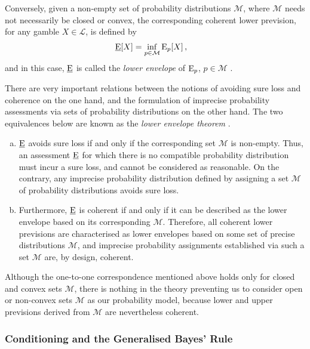 Conversely, given a non-empty set of probability distributions $\mathcal{M}$,
where $\mathcal{M}$ needs not necessarily be closed or convex,
the corresponding coherent lower prevision, for any gamble $X \in \mathcal{L}$,
is defined by
\begin{align*}
\underline{\operatorname{E}}[X] &= \inf_{p \in \mathcal{M}} \operatorname{E}_p[X]\,,
\end{align*}
and in this case, $\underline{\operatorname{E}}$ is called the \emph{lower envelope} of $\operatorname{E}_p$, $p \in \mathcal{M}$
\parencite[p.~132]{1991:walley}.

There are very important relations between the notions of avoiding sure loss and coherence on the one hand,
and the formulation of imprecise probability assessments via sets of probability distributions on the other hand.
The two equivalences below are known as the \emph{lower envelope theorem} \parencite[\S 3.3.3]{1991:walley}.
\begin{enumerate}[(a)]
\item $\underline{\operatorname{E}}$ avoids sure loss if and only if the corresponding set $\mathcal{M}$ is non-empty.
Thus, an assessment $\underline{\operatorname{E}}$ for which there is no compatible probability distribution
must incur a sure loss, and cannot be considered as reasonable.
On the contrary, any imprecise probability distribution defined by assigning
a set $\mathcal{M}$ of probability distributions avoids sure loss.
\item Furthermore, $\underline{\operatorname{E}}$ is coherent if and only if it can be
described as the lower envelope based on its corresponding $\mathcal{M}$.
Therefore, all coherent lower previsions are characterised as
lower envelopes based on some set of precise distributions $\mathcal{M}$,
and imprecise probability assignments established via such a set $\mathcal{M}$
are, by design, coherent.
\end{enumerate}

Although the one-to-one correspondence mentioned above holds only for closed and convex sets $\mathcal{M}$,
there is nothing in the theory preventing us to consider
open or non-convex sets $\mathcal{M}$ as our probability model, %
because lower and upper previsions derived from $\mathcal{M}$ are nevertheless coherent.

%
%

\subsubsection{Conditioning and the Generalised Bayes' Rule}
\label{sec:gbr}

